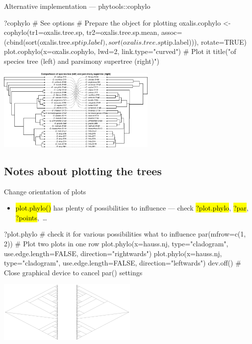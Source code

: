 \documentclass[compress, ucs, xelatex, 11pt, xcolor=svgnames,
	hyperref={
		bookmarks=true,
		unicode=true,
		colorlinks=true,
		pdftitle={Molecular data in R},
		plainpages=false,
		pdfauthor={Vojtech Zeisek},
		pdfsubject={Course about phylogeny and evolution in R},
		pdfcreator={XeLaTeX},
		pdfkeywords={R, evolution, phylogeny, molecular data},
		linkcolor=Tomato,
		anchorcolor=SaddleBrown,
		citecolor=Goldenrod,
		filecolor=DarkMagenta,
		menucolor=Sienna,
		urlcolor=DarkTurquoise,
		pdftex},
	url={hyphens, lowtilde} %
	]{beamer}
\renewcommand{\texttt}[1]{\hl{\ttfamily #1}}
\begin{document}
\begin{frame}[fragile]{Alternative implementation --- phytools::cophylo}
	\begin{spluscode}
    ?cophylo # See options
    # Prepare the object for plotting
    oxalis.cophylo <- cophylo(tr1=oxalis.tree.sp, tr2=oxalis.tree.sp.mean,
      assoc=(cbind(sort(oxalis.tree.sp$tip.label),
      sort(oxalis.tree.sp$tip.label))), rotate=TRUE)
    plot.cophylo(x=oxalis.cophylo, lwd=2, link.type="curved") # Plot it
    title("\nComparisson of species tree (left) and parsimony supertree
      (right)")
	\end{spluscode}
	\begin{center}
		\includegraphics[height=4cm]{cophylo.png}
	\end{center}
\end{frame}

\subsection{Notes about plotting the trees}

\begin{frame}[fragile]{Change orientation of plots}
	\begin{itemize}
		\item \alert{\texttt{plot.phylo()} has plenty of possibilities to influence --- check \texttt{?plot.phylo}, \texttt{?par}, \texttt{?points},~\ldots}
	\end{itemize}
	\begin{spluscode}
    ?plot.phylo # check it for various possibilities what to influence
    par(mfrow=c(1, 2)) # Plot two plots in one row
    plot.phylo(x=hauss.nj, type="cladogram", use.edge.length=FALSE,
      direction="rightwards")
    plot.phylo(x=hauss.nj, type="cladogram", use.edge.length=FALSE,
      direction="leftwards")
    dev.off() # Close graphical device to cancel par() settings
	\end{spluscode}
	\begin{center}
		\includegraphics[height=3cm]{lr.png}
	\end{center}
\end{frame}
\end{document}
